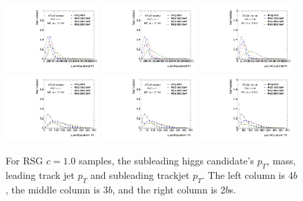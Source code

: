 \begin{figure}[htbp!]
\begin{center}
\includegraphics[angle=270, width=0.32\textwidth]{./figures/boosted/Truth/Moriond_comp_0_FourTag_Signal_sublHCand_trk0_Pt.pdf}
\includegraphics[angle=270, width=0.32\textwidth]{./figures/boosted/Truth/Moriond_comp_0_ThreeTag_Signal_sublHCand_trk0_Pt.pdf}
\includegraphics[angle=270, width=0.32\textwidth]{./figures/boosted/Truth/Moriond_comp_0_TwoTag_split_Signal_sublHCand_trk0_Pt.pdf}\\
\includegraphics[angle=270, width=0.32\textwidth]{./figures/boosted/Truth/Moriond_comp_0_FourTag_Signal_sublHCand_trk1_Pt.pdf}
\includegraphics[angle=270, width=0.32\textwidth]{./figures/boosted/Truth/Moriond_comp_0_ThreeTag_Signal_sublHCand_trk1_Pt.pdf}
\includegraphics[angle=270, width=0.32\textwidth]{./figures/boosted/Truth/Moriond_comp_0_TwoTag_split_Signal_sublHCand_trk1_Pt.pdf}\\
\caption{For RSG $c=1.0$ samples, the subleading higgs candidate's $p_T$, mass, leading track jet $p_T$ and subleading trackjet $p_T$. The left column is 4$b$, the middle column is 3$b$, and the right column is 2$b$s.}
\label{fig:app-signal-sublHCand}
\end{center}
\end{figure}
